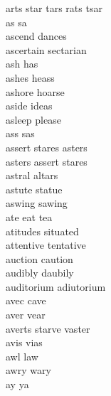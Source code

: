 arts star tars rats tsar\\
as sa\\
ascend dances\\
ascertain sectarian\\
ash has\\
ashes heass\\
ashore hoarse\\
aside ideas\\
asleep please\\
ass sas\\
assert stares asters\\
asters assert stares\\
astral altars\\
astute statue\\
aswing sawing\\
ate eat tea\\
atitudes situated\\
attentive tentative\\
auction caution\\
audibly daubily\\
auditorium adiutorium\\
avec cave\\
aver vear\\
averts starve vaster\\
avis vias\\
awl law\\
awry wary\\
ay ya\\

